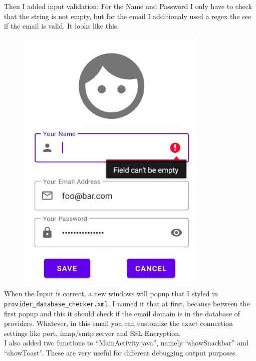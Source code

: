 Then I added input validation: For the Name and Password I only have to check that the string is not empty, but for the email I additionaly used a regex the see if the email is valid. It looks like this:\\

\begin{figure}[H]
\centering
\includegraphics[height=.3\textheight]{media/newemail}
\end{figure}

When the Input is correct, a new windows will popup that I styled in \texttt{provider\_database\_checker.xml}. I named it that at first, because between the first popup and this it should check if the email domain is in the database of providers. Whatever, in this email you can customize the exact connection settings like port, imap/smtp server and SSL Encryption.\\

I also added two functions to ``MainActivity.java'', namely ``showSnackbar'' and ``showToast''. These are very useful for different debugging output purposes.
